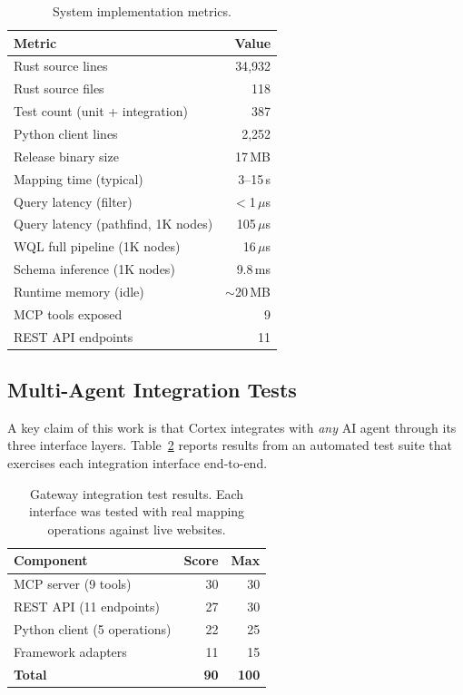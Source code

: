 \documentclass[10pt, twocolumn]{article}
\begin{document}
\begin{table}[t]
\caption{System implementation metrics.}
\label{tab:system}
\centering
\small
\begin{tabular}{@{}lr@{}}
\toprule
\textbf{Metric} & \textbf{Value} \\
\midrule
Rust source lines & 34{,}932 \\
Rust source files & 118 \\
Test count (unit + integration) & 387 \\
Python client lines & 2{,}252 \\
Release binary size & 17\,MB \\
Mapping time (typical) & 3--15\,s \\
Query latency (filter) & $<$1\,$\mu$s \\
Query latency (pathfind, 1K nodes) & 105\,$\mu$s \\
WQL full pipeline (1K nodes) & 16\,$\mu$s \\
Schema inference (1K nodes) & 9.8\,ms \\
Runtime memory (idle) & $\sim$20\,MB \\
MCP tools exposed & 9 \\
REST API endpoints & 11 \\
\bottomrule
\end{tabular}
\end{table}


\subsection{Multi-Agent Integration Tests}

A key claim of this work is that Cortex integrates with \emph{any} AI agent through its three interface layers. Table~\ref{tab:gateway} reports results from an automated test suite that exercises each integration interface end-to-end.

\begin{table}[t]
\caption{Gateway integration test results. Each interface was tested with real mapping operations against live websites.}
\label{tab:gateway}
\centering
\small
\begin{tabular}{@{}lrr@{}}
\toprule
\textbf{Component} & \textbf{Score} & \textbf{Max} \\
\midrule
MCP server (9 tools) & 30 & 30 \\
REST API (11 endpoints) & 27 & 30 \\
Python client (5 operations) & 22 & 25 \\
Framework adapters & 11 & 15 \\
\midrule
\textbf{Total} & \textbf{90} & \textbf{100} \\
\bottomrule
\end{tabular}
\end{table}
\end{document}
